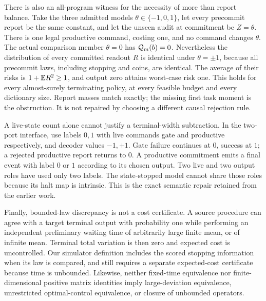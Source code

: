 There is also an all-program witness for the necessity of more than report balance. Take the three admitted models $\theta\in\{-1,0,1\}$, let every precommit report be the same constant, and let the unseen audit at commitment be $Z=\theta$. There is one legal productive command, costing one, and no command changes $\theta$. The actual comparison member $\theta=0$ has $\mathcal Q_m(b)=0$. Nevertheless the distribution of every committed readout $R$ is identical under $\theta=\pm1$, because all precommit laws, including stopping and coins, are identical. The average of their risks is $1+\mathbb E R^2\ge1$, and output zero attains worst-case risk one. This holds for every almost-surely terminating policy, at every feasible budget and every dictionary size. Report masses match exactly; the missing first task moment is the obstruction. It is not repaired by choosing a different causal rejection rule.

A live-state count alone cannot justify a terminal-width subtraction. In the two-port interface, use labels $0,1$ with live commands gate and productive respectively, and decoder values $-1,+1$. Gate failure continues at $0$, success at $1$; a rejected productive report returns to $0$. A productive commitment emits a final event with label $0$ or $1$ according to its chosen output. Two live and two output roles have used only two labels. The state-stopped model cannot share those roles because its halt map is intrinsic. This is the exact semantic repair retained from the earlier work.

Finally, bounded-law discrepancy is not a cost certificate. A source procedure can agree with a target terminal output with probability one while performing an independent preliminary waiting time of arbitrarily large finite mean, or of infinite mean. Terminal total variation is then zero and expected cost is uncontrolled. Our simulator definition includes the scored stopping information when its law is compared, and still requires a separate expected-cost certificate because time is unbounded. Likewise, neither fixed-time equivalence nor finite-dimensional positive matrix identities imply large-deviation equivalence, unrestricted optimal-control equivalence, or closure of unbounded operators.

